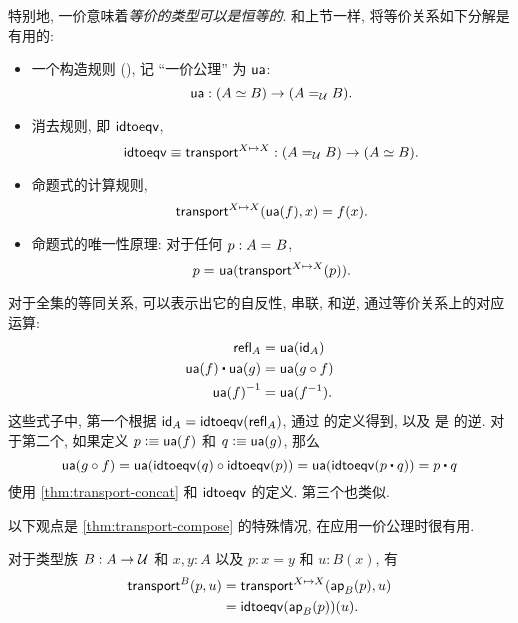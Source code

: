 特别地, 一价意味着\emph{等价的类型可以是恒等的}.
和上节一样, 将等价关系如下分解是有用的:
%
\begin{itemize}
    \item 一个构造规则 {()}, 记 ``一价公理'' 为 $\ua$:
    \[
        \ua : ({\eqv A B}) \to (\id[\type]{A}{B}).
    \]
    \item 消去规则, 即 $\idtoeqv$,
    \[
        \idtoeqv \jdeq \transfibf{X \mapsto X} : (\id[\type]{A}{B}) \to (\eqv A B).
    \]
    \item 命题式的计算规则,
    \[
        \transfib{X \mapsto X}{\ua(f)}{x} = f(x).
    \]
    \item 命题式的唯一性原理: 
    对于任何 $p : \id A B$,
    \[
        \id{p}{\ua(\transfibf{X \mapsto X}(p))}.
    \]
\end{itemize}
%
对于全集的等同关系, 可以表示出它的自反性, 串联, 和逆, 通过等价关系上的对应运算:
\begin{align*}
    \refl{A} &= \ua(\idfunc[A]) \\
    \ua(f) \ct \ua(g) &= \ua(g\circ f) \\
    \opp{\ua(f)} &= \ua(f^{-1}).
\end{align*}
这些式子中, 第一个根据 $\idfunc[A] = \idtoeqv(\refl{A})$, 通过 \idtoeqv 的定义得到, 以及 \ua 是 \idtoeqv 的逆.
对于第二个, 如果定义 $p \defeq \ua(f)$ 和 $q\defeq \ua(g)$, 那么
\[ \ua(g\circ f) = \ua(\idtoeqv(q) \circ \idtoeqv(p)) = \ua(\idtoeqv(p\ct q)) = p\ct q\]
使用 \cref{thm:transport-concat} 和 $\idtoeqv$ 的定义.
第三个也类似.

以下观点是 \cref{thm:transport-compose} 的特殊情况, 在应用一价公理时很有用.

\begin{lem}
    \label{thm:transport-is-ap}
    对于类型族 $B:A\to\type$ 和 $x,y:A$ 以及 $p:x=y$ 和 $u:B(x)$, 有
    \begin{align*}
        \transfib{B}{p}{u} &= \transfib{X\mapsto X}{\apfunc{B}(p)}{u}\\
        &= \idtoeqv(\apfunc{B}(p))(u).
    \end{align*}
\end{lem}

%
%